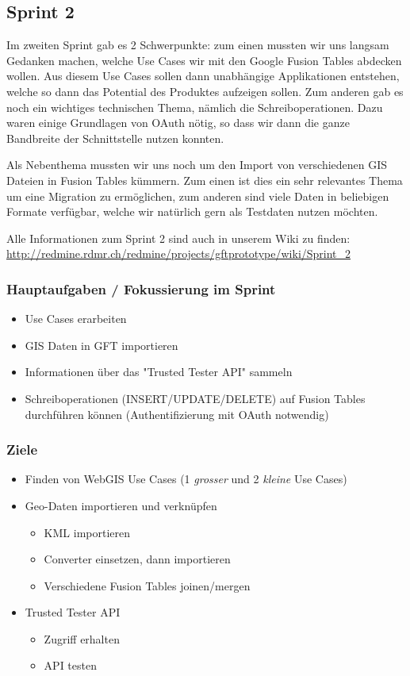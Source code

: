 \subsection{Sprint 2}

Im zweiten Sprint gab es 2 Schwerpunkte: zum einen mussten wir uns langsam Gedanken machen, welche Use Cases wir mit den Google Fusion Tables abdecken wollen. Aus diesem Use Cases sollen dann unabhängige Applikationen entstehen, welche so dann das Potential des Produktes aufzeigen sollen. Zum anderen gab es noch ein wichtiges technischen Thema, nämlich die Schreiboperationen. Dazu waren einige Grundlagen von OAuth nötig, so dass wir dann die ganze Bandbreite der Schnittstelle nutzen konnten.

Als Nebenthema mussten wir uns noch um den Import von verschiedenen GIS Dateien in Fusion Tables kümmern. Zum einen ist dies ein sehr relevantes Thema um eine Migration zu ermöglichen, zum anderen sind viele Daten in beliebigen Formate verfügbar, welche wir natürlich gern als Testdaten nutzen möchten.

Alle Informationen zum Sprint 2 sind auch in unserem Wiki zu finden:
\url{http://redmine.rdmr.ch/redmine/projects/gftprototype/wiki/Sprint_2}

\subsubsection{Hauptaufgaben / Fokussierung im Sprint}
\begin{itemize}
	\item Use Cases erarbeiten
	\item GIS Daten in GFT importieren
	\item Informationen über das "Trusted Tester API" sammeln
	\item Schreiboperationen (INSERT/UPDATE/DELETE) auf Fusion Tables durchführen können (Authentifizierung mit OAuth notwendig)
\end{itemize}

\subsubsection{Ziele}
\begin{itemize}
	\item  Finden von WebGIS Use Cases (1 \emph{grosser} und 2 \emph{kleine} Use Cases)
	\item  Geo-Daten importieren und verknüpfen
	\begin{itemize}
		\item KML importieren
		\item Converter einsetzen, dann importieren
		\item Verschiedene Fusion Tables joinen/mergen
	\end{itemize}
	\item Trusted Tester API
	\begin{itemize}
		\item Zugriff erhalten
		\item API testen
	\end{itemize}
\end{itemize}

